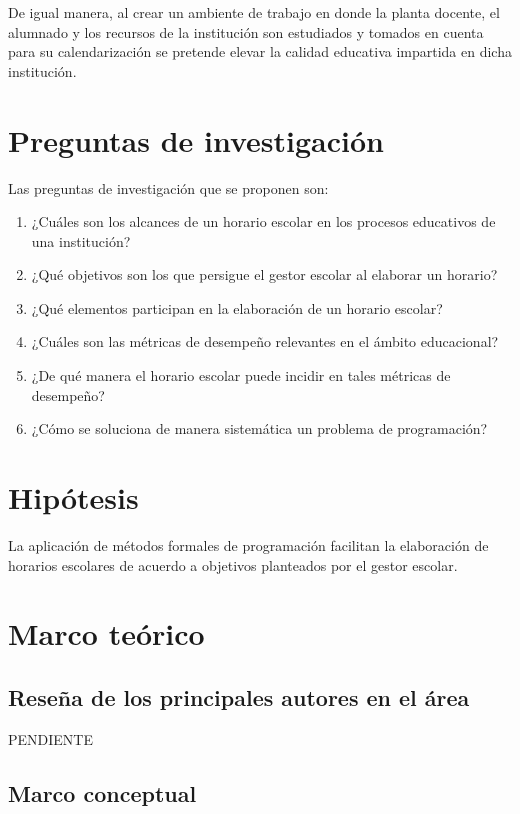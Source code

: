 \documentclass[spanish,draft,12pt,headsepline,footsepline,paper=letter]{scrreprt}
\begin{document}
De igual manera, al crear un ambiente de trabajo en donde la planta docente, el alumnado y los recursos de la institución son estudiados y tomados en cuenta para su calendarización se pretende elevar la calidad educativa impartida en dicha institución.

\section*{Preguntas de investigación}

Las preguntas de investigación que se proponen son:

\begin{enumerate}[1]
\setlength{\itemsep}{0cm}%
\setlength{\parskip}{0cm}%
\item ¿Cuáles son los alcances de un horario escolar en los procesos educativos de una institución?
\item ¿Qué objetivos son los que persigue el gestor escolar al elaborar un horario?
\item ¿Qué elementos participan en la elaboración de un horario escolar?
\item ¿Cuáles son las métricas de desempeño relevantes en el ámbito educacional?
\item ¿De qué manera el horario escolar puede incidir en tales métricas de desempeño?
\item ¿Cómo se soluciona de manera sistemática un problema de programación?
\end{enumerate}

\section*{Hipótesis}

La aplicación de métodos formales de programación facilitan la elaboración de horarios escolares de acuerdo a objetivos planteados por el gestor escolar.

\section*{Marco teórico}

\subsection*{Reseña de los principales autores en el área}

PENDIENTE

\subsection*{Marco conceptual}
\end{document}
